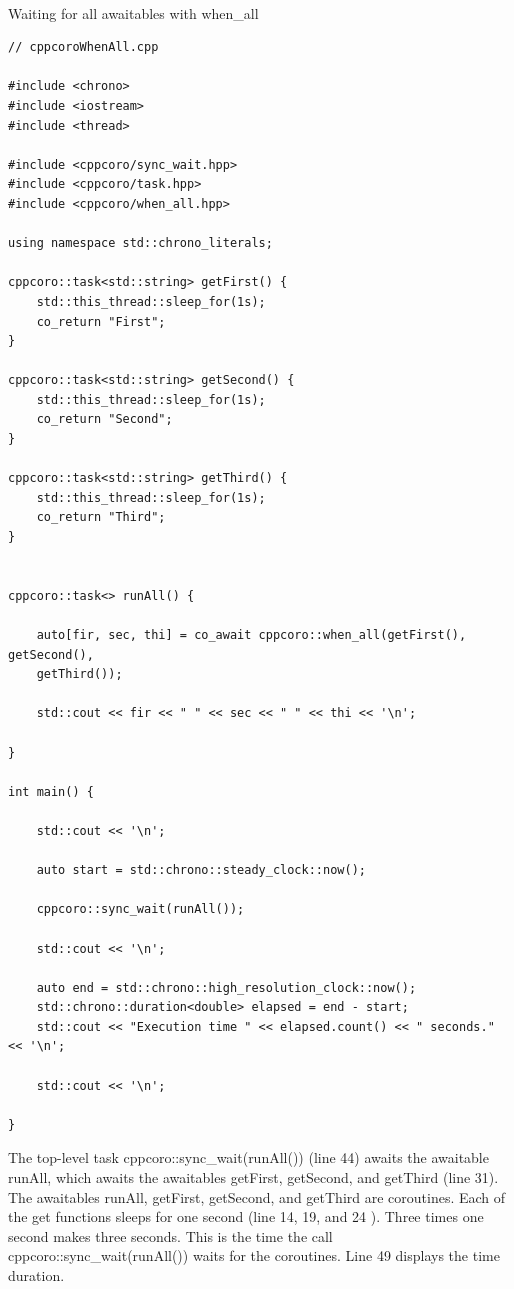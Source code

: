 \hspace*{\fill} \\ %
\noindent
Waiting for all awaitables with when\_all
\begin{lstlisting}[style=styleCXX]
// cppcoroWhenAll.cpp

#include <chrono>
#include <iostream>
#include <thread>

#include <cppcoro/sync_wait.hpp>
#include <cppcoro/task.hpp>
#include <cppcoro/when_all.hpp>

using namespace std::chrono_literals;

cppcoro::task<std::string> getFirst() {
	std::this_thread::sleep_for(1s);
	co_return "First";
}

cppcoro::task<std::string> getSecond() {
	std::this_thread::sleep_for(1s);
	co_return "Second";
}

cppcoro::task<std::string> getThird() {
	std::this_thread::sleep_for(1s);
	co_return "Third";
}


cppcoro::task<> runAll() {

	auto[fir, sec, thi] = co_await cppcoro::when_all(getFirst(), getSecond(),
	getThird());
	
	std::cout << fir << " " << sec << " " << thi << '\n';

}

int main() {

	std::cout << '\n';
	
	auto start = std::chrono::steady_clock::now();
	
	cppcoro::sync_wait(runAll());
	
	std::cout << '\n';
	
	auto end = std::chrono::high_resolution_clock::now();
	std::chrono::duration<double> elapsed = end - start;
	std::cout << "Execution time " << elapsed.count() << " seconds." << '\n';
	
	std::cout << '\n';

}
\end{lstlisting}

The top-level task cppcoro::sync\_wait(runAll()) (line 44) awaits the awaitable runAll, which awaits the awaitables getFirst, getSecond, and getThird (line 31). The awaitables runAll, getFirst, getSecond, and getThird are coroutines. Each of the get functions sleeps for one second (line 14, 19, and 24 ). Three times one second makes three seconds. This is the time the call cppcoro::sync\_wait(runAll()) waits for the coroutines. Line 49 displays the time duration.


